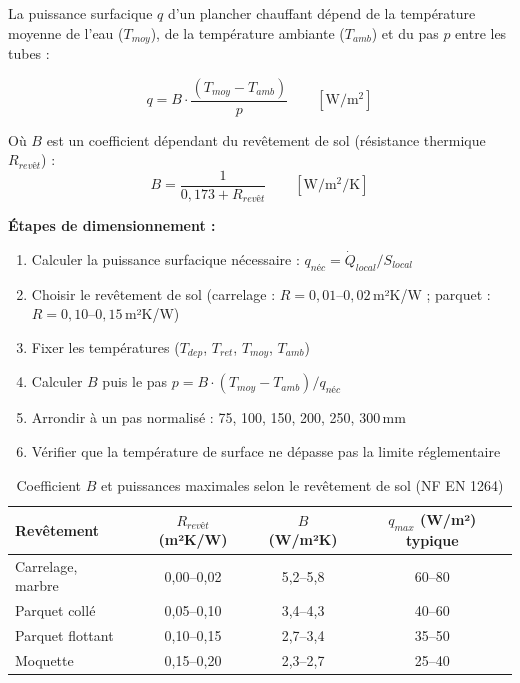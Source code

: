 \begin{methode}[title=Calcul du pas de tube (NF EN 1264)]
La puissance surfacique $q$ d'un plancher chauffant dépend de la température moyenne de l'eau ($T_{moy}$), de la température ambiante ($T_{amb}$) et du pas $p$ entre les tubes :

\begin{equation}
  q = B \cdot \frac{(T_{moy} - T_{amb})}{p} \qquad \left[\si{\watt\per\square\metre}\right]
\end{equation}

Où $B$ est un coefficient dépendant du revêtement de sol (résistance thermique $R_{revêt}$) :
\begin{equation}
  B = \frac{1}{0{,}173 + R_{revêt}} \qquad [\si{\watt\per\square\metre\per\kelvin}]
\end{equation}

\textbf{Étapes de dimensionnement :}
\begin{enumerate}
  \item Calculer la puissance surfacique nécessaire : $q_{néc} = \dot{Q}_{local} / S_{local}$
  \item Choisir le revêtement de sol (carrelage : $R = 0{,}01$--$0{,}02$\,m²K/W ; parquet : $R = 0{,}10$--$0{,}15$\,m²K/W)
  \item Fixer les températures ($T_{dep}$, $T_{ret}$, $T_{moy}$, $T_{amb}$)
  \item Calculer $B$ puis le pas $p = B \cdot (T_{moy} - T_{amb}) / q_{néc}$
  \item Arrondir à un pas normalisé : 75, 100, 150, 200, 250, 300\,mm
  \item Vérifier que la température de surface ne dépasse pas la limite réglementaire
\end{enumerate}
\end{methode}

\begin{table}[H]
  \centering
  \caption{Coefficient $B$ et puissances maximales selon le revêtement de sol (NF EN 1264)}
  \begin{tabular}{lccc}
    \toprule
    Revêtement & $R_{revêt}$ (m²K/W) & $B$ (W/m²K) & $q_{max}$ (W/m²) typique \\
    \midrule
    Carrelage, marbre & 0,00–0,02 & 5,2–5,8 & 60–80 \\
    Parquet collé & 0,05–0,10 & 3,4–4,3 & 40–60 \\
    Parquet flottant & 0,10–0,15 & 2,7–3,4 & 35–50 \\
    Moquette & 0,15–0,20 & 2,3–2,7 & 25–40 \\
    \bottomrule
  \end{tabular}
\end{table}

